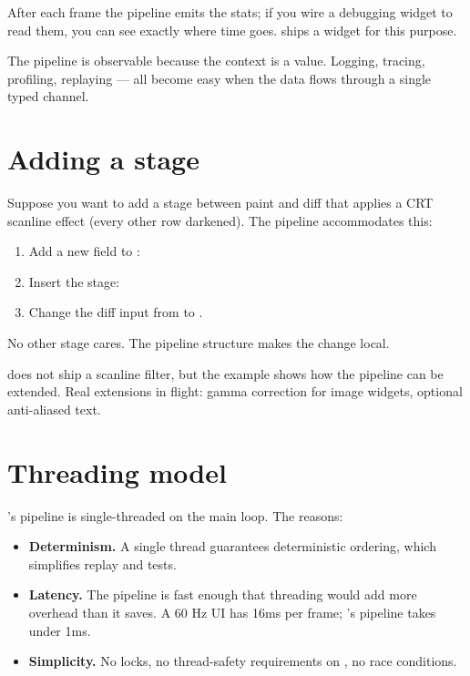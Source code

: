 After each frame the pipeline emits the stats; if you wire a
debugging widget to read them, you can see exactly where time
goes.  ships a
 widget for this purpose.

\begin{idea}
The pipeline is observable because the context is a value.
Logging, tracing, profiling, replaying --- all become easy when
the data flows through a single typed channel.
\end{idea}

\section{Adding a stage}

Suppose you want to add a stage between paint and diff that
applies a CRT scanline effect (every other row darkened). The
pipeline accommodates this:

\begin{enumerate}[leftmargin=*]
  \item Add a new field to :
  \item Insert the stage:
  \item Change the diff input from  to
    .
\end{enumerate}

No other stage cares. The pipeline structure makes the change
local.

\maya{} does not ship a scanline filter, but the example shows
how the pipeline can be extended. Real extensions in flight:
gamma correction for image widgets, optional anti-aliased text.

\section{Threading model}

\maya{}'s pipeline is single-threaded on the main loop. The
reasons:

\begin{itemize}[leftmargin=*]
  \item \textbf{Determinism.} A single thread guarantees
    deterministic ordering, which simplifies replay and tests.
  \item \textbf{Latency.} The pipeline is fast enough that
    threading would add more overhead than it saves. A 60 Hz
    UI has 16ms per frame; \maya{}'s pipeline takes under 1ms.
  \item \textbf{Simplicity.} No locks, no thread-safety
    requirements on , no race conditions.
\end{itemize}

